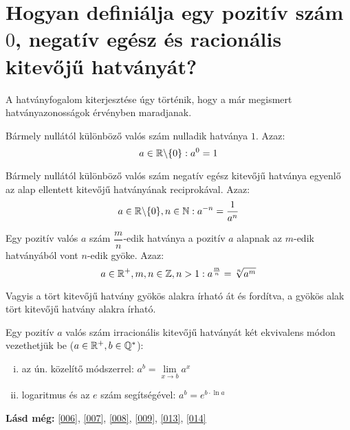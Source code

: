 
\section{Hogyan definiálja egy pozitív szám \texorpdfstring{$0$}{0}, negatív
  egész és racionális kitevőjű hatványát?}
\label{012}

A hatványfogalom kiterjesztése úgy történik, hogy a már megismert
hatványazonosságok érvényben maradjanak.

\begin{defin}
Bármely nullától különböző valós szám nulladik hatványa $1$. Azaz:
\[
  a \in \mathbb{R} \backslash \{0\}: a^0 = 1
\]
\end{defin}

\begin{defin}
Bármely nullától különböző valós szám negatív egész kitevőjű hatványa egyenlő
az alap ellentett kitevőjű hatványának reciprokával. Azaz:
\[
  a \in \mathbb{R} \backslash \{0\}, n \in \mathbb{N}: a^{-n} = \dfrac{1}{a^n}
\]
\end{defin}

\begin{defin}
Egy pozitív valós $a$ szám $\dfrac{m}{n}$-edik hatványa a pozitív $a$ alapnak
az $m$-edik hatványából vont $n$-edik gyöke. Azaz:
\[
  a \in \mathbb{R}^+, m, n \in \mathbb{Z}, n > 1: a^{\frac{m}{n}} = \sqrt[n]{a^m}
\]

Vagyis a tört kitevőjű hatvány gyökös alakra írható át és fordítva, a gyökös
alak tört kitevőjű hatvány alakra írható.
\end{defin}

\begin{defin4}
Egy pozitív $a$ valós szám irracionális kitevőjű hatványát két ekvivalens módon
vezethetjük be ($a \in \mathbb{R}^+, b \in \mathbb{Q^*}$):
\begin{enumerate}[i)]
\item az ún. közelítő módszerrel: $a^b = \lim\limits_{x \to b} a^x$
\item logaritmus és az $e$ szám segítségével: $a^b = e^{b \cdot \ln a}$
\end{enumerate}
\end{defin4}

\textbf{Lásd még:} \ref{006}, \ref{007}, \ref{008}, \ref{009}, \ref{013}, \ref{014}
